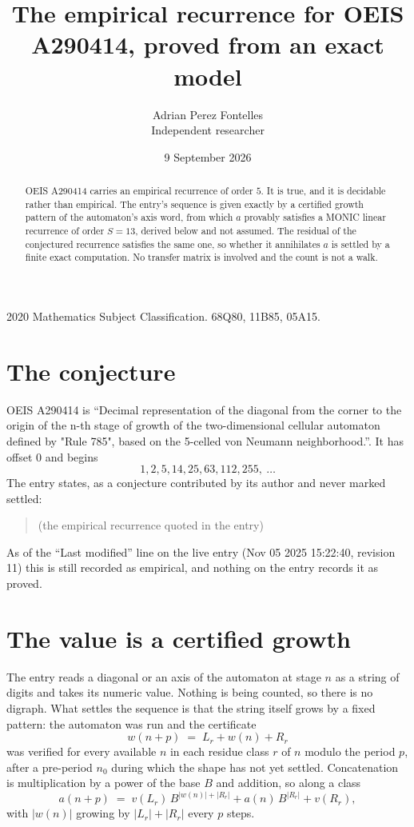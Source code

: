 \documentclass[11pt,a4paper]{article}
\title{The empirical recurrence for OEIS A290414, proved from an exact model}
\author{Adrian Perez Fontelles\\ \small Independent researcher}
\date{9 September 2026}
\theoremstyle{plain}
\theoremstyle{definition}
\begin{document}
\maketitle

\begin{abstract}
OEIS A290414 carries an empirical recurrence of order $5$. It is true, and it is
decidable rather than empirical. The entry's sequence is given exactly by a certified growth pattern of the automaton's axis word, from
which $a$ provably satisfies a MONIC linear recurrence of order $S=13$, derived below and not
assumed. The residual of the conjectured recurrence satisfies the same one, so whether it
annihilates $a$ is settled by a finite exact computation. No transfer matrix is involved and
the count is not a walk.
\end{abstract}

\noindent\small 2020 Mathematics Subject Classification. 68Q80, 11B85, 05A15.\normalsize

\section{The conjecture}

OEIS A290414 is ``Decimal representation of the diagonal from the corner to the origin of the n-th stage of growth of the two-dimensional cellular automaton defined by "Rule 785", based on the 5-celled von Neumann neighborhood.''. It has offset $0$ and begins
\[
1, 2, 5, 14, 25, 63, 112, 255,\ \dots
\]
The entry states, as a conjecture contributed by its author and never marked settled:
\begin{quote}
(the empirical recurrence quoted in the entry)
\end{quote}
As of the ``Last modified'' line on the live entry (Nov 05 2025 15:22:40, revision 11)
this is still recorded as empirical, and nothing on the entry records it as proved.

\section{The value is a certified growth}

The entry reads a diagonal or an axis of the automaton at stage $n$ as a string of digits and takes its
numeric value. Nothing is being counted, so there is no digraph. What settles the sequence is
that the string itself grows by a fixed pattern: the automaton was run and the certificate
\[
w(n+p)\;=\;L_r + w(n) + R_r
\]
was verified for every available $n$ in each residue class $r$ of $n$ modulo the period $p$,
after a pre-period $n_0$ during which the shape has not yet settled. Concatenation is
multiplication by a power of the base $B$ and addition, so along a class
\[
a(n+p)\;=\;v(L_r)\,B^{|w(n)|+|R_r|} + a(n)\,B^{|R_r|} + v(R_r),
\]
with $|w(n)|$ growing by $|L_r|+|R_r|$ every $p$ steps.
\end{document}
